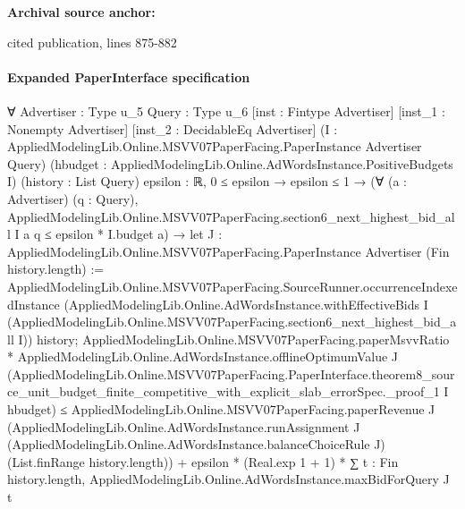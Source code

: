 \documentclass[10pt]{article}
\begin{document}
\textbf{Archival source anchor:} {\footnotesize\raggedright cited publication, lines 875-\allowbreak{}882\par}
\paragraph{Expanded PaperInterface specification}
\begin{ReviewVerbatim}
∀ {Advertiser : Type u_5} {Query : Type u_6} [inst : Fintype Advertiser] [inst_1 : Nonempty Advertiser]
  [inst_2 : DecidableEq Advertiser] (I : AppliedModelingLib.Online.MSVV07PaperFacing.PaperInstance Advertiser Query)
  (hbudget : AppliedModelingLib.Online.AdWordsInstance.PositiveBudgets I) (history : List Query) {epsilon : ℝ},
  0 ≤ epsilon →
    epsilon ≤ 1 →
      (∀ (a : Advertiser) (q : Query),
          AppliedModelingLib.Online.MSVV07PaperFacing.section6_next_highest_bid_all I a q ≤ epsilon * I.budget a) →
        let J : AppliedModelingLib.Online.MSVV07PaperFacing.PaperInstance Advertiser (Fin history.length) :=
          AppliedModelingLib.Online.MSVV07PaperFacing.SourceRunner.occurrenceIndexedInstance
            (AppliedModelingLib.Online.AdWordsInstance.withEffectiveBids I
              (AppliedModelingLib.Online.MSVV07PaperFacing.section6_next_highest_bid_all I))
            history;
        AppliedModelingLib.Online.MSVV07PaperFacing.paperMsvvRatio *
            AppliedModelingLib.Online.AdWordsInstance.offlineOptimumValue J
              (AppliedModelingLib.Online.MSVV07PaperFacing.PaperInterface.theorem8_source_unit_budget_finite_competitive_with_explicit_slab_errorSpec._proof_1
                I hbudget) ≤
          AppliedModelingLib.Online.MSVV07PaperFacing.paperRevenue J
              (AppliedModelingLib.Online.AdWordsInstance.runAssignment J
                (AppliedModelingLib.Online.AdWordsInstance.balanceChoiceRule J) (List.finRange history.length)) +
            epsilon * (Real.exp 1 + 1) *
              ∑ t : Fin history.length, AppliedModelingLib.Online.AdWordsInstance.maxBidForQuery J t
\end{ReviewVerbatim}
\end{document}
